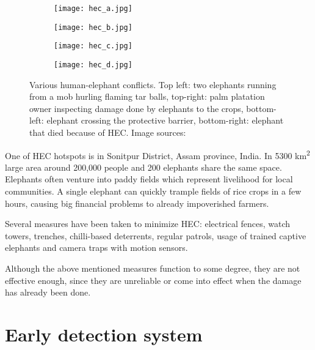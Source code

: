 \begin{figure}[ht]
    \begin{subfigure}{0.5\textwidth}
        \centering
        \texttt{[image: hec\_a.jpg]} 
    \end{subfigure}
    \begin{subfigure}{0.5\textwidth}
        \centering
        \texttt{[image: hec\_b.jpg]} 
    \end{subfigure}
    \begin{subfigure}{0.5\textwidth}
        \centering
        \texttt{[image: hec\_c.jpg]} 
    \end{subfigure}
    \begin{subfigure}{0.5\textwidth}
        \centering
        \texttt{[image: hec\_d.jpg]} 
    \end{subfigure}
    \caption{Various human-elephant conflicts. Top left: two elephants running from a mob hurling flaming tar balls, top-right: palm platation owner inspecting damage done by elephants to the crops, bottom-left: elephant crossing the protective barrier, bottom-right: elephant that died because of HEC. Image sources:\cite{wildlabs-elephants}\cite{econe_image}\cite{save_our_species_image}\cite{the_week_image}}
    \label{various_hec}
\end{figure}

One of HEC hotspots is in Sonitpur District, Assam province, India. 
In 5300 km\textsuperscript{2} large area around 200,000 people and 200 elephants share the same space\cite{wildlabs-elephants}.
Elephants often venture into paddy fields which represent livelihood for local communities.
A single elephant can quickly trample fields of rice crops in a few hours, causing big financial problems to already impoverished farmers\cite{wildlabs-elephants}.

Several measures have been taken to minimize HEC: electrical fences, watch towers, trenches, chilli-based deterrents, regular patrols, usage of trained captive elephants and camera traps with motion sensors.

Although the above mentioned measures function to some degree, they are not effective enough, since they are unreliable or come into effect when the damage has already been done\cite{wildlabs}. 

\section{ Early detection system}

